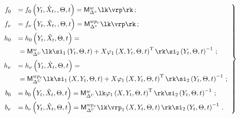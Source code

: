 \begin{equation}

\left.

\begin{array}{rl}

    f_0&=f_0 \left(Y_t,\hat X_t,,\Theta, t\right) ={\sf M}_{\Delta^x}^{w} \lk \vrp\rk\,;

\\[6pt]

    f_\nu&=f_\nu \left(Y_t,\hat X_t,,\Theta, t\right) ={\sf M}_{\Delta^x}^{w p_\nu} \lk \vrp\rk\,; %

\\[6pt]

    h_0&=h_0 \left(Y_t,\hat X_t,\Theta, t\right) ={}\\[6pt]

    &{}={\sf M}_{\Delta^U}^{w} \lk \si_1 

    \left(Y_t,\Theta, t\right)+

    X\varphi_1 \left(X,Y_t,\Theta, t\right)^{\mathrm{T}}\rk \si_2

    \left(Y_t,\Theta,t\right)^{-1}\,; %

    \\[6pt]

    h_\nu&= h_\nu \left(Y_t,\hat X_t,\Theta, t\right)={}\\[6pt]

    &{}=

    {\sf M}_{\Delta^U}^{w p_\nu}  \lk \si_1 \left(X,Y_t,\Theta, t\right)+ X\varphi_1

   \left( X,Y_t,\Theta, t\right)^{\mathrm{T}}\rk  \si_2

    \left(Y_t,\Theta,t\right)^{-1}\,; %

\\[6pt]

    b_0&= b_0 \left(Y_t,\hat X_t,\Theta, t\right)

    ={\sf M}_{\Delta^U}^{w} \lk \varphi_1 \left(X,Y_t,\Theta, t\right)^{\mathrm{T}} \rk 

    \si_2\left(Y_t,\Theta,t\right)^{-1}\,; %

    \\[6pt]

    b_\nu&=b_\nu \left(Y_t,\hat X_t,\Theta, t\right)

    ={\sf M}_{\Delta^U}^{w p_\nu} \lk \vrp_1\left(X,Y_t,\Theta, t\right) \rk \si_2

    \left(Y_t,\Theta,t\right)^{-1}\,. %

    \end{array}

    \right\}

        \label{e3.8-s2}

    \end{equation}



